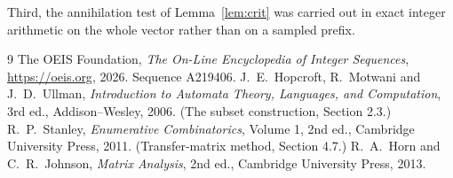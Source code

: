 \documentclass[11pt,a4paper]{article}
\theoremstyle{plain}
\theoremstyle{definition}
\begin{document}
Third, the annihilation test of Lemma~\ref{lem:crit} was carried out in exact integer
arithmetic on the whole vector rather than on a sampled prefix.

\begin{thebibliography}{9}
 The OEIS Foundation, \emph{The On-Line Encyclopedia of Integer
Sequences}, \url{https://oeis.org}, 2026. Sequence A219406.
 J.~E.~Hopcroft, R.~Motwani and J.~D.~Ullman, \emph{Introduction to Automata
Theory, Languages, and Computation}, 3rd ed., Addison--Wesley, 2006. (The subset
construction, Section 2.3.)
 R.~P.~Stanley, \emph{Enumerative Combinatorics}, Volume 1, 2nd ed.,
Cambridge University Press, 2011. (Transfer-matrix method, Section 4.7.)
 R.~A.~Horn and C.~R.~Johnson, \emph{Matrix Analysis}, 2nd ed., Cambridge
University Press, 2013.
\end{thebibliography}
\end{document}
